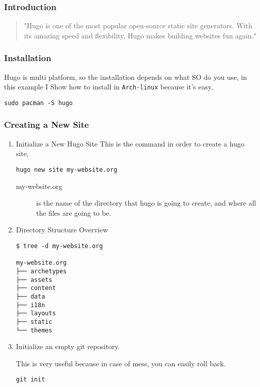 \documentclass[11pt]{article}
\begin{document}
\subsubsection{Introduction}
\label{sec:org1465eee}
\begin{quote}
"Hugo is one of the most popular open-source static site generators. With its amazing speed and flexibility, Hugo makes building websites fun again."
\end{quote}
\subsubsection{Installation}
\label{sec:org0e34b12}
Hugo is multi platform, so the installation depends on what SO do you use, in this example I Show how to install in \texttt{Arch-linux} because it's easy.

\begin{verbatim}
sudo pacman -S hugo
\end{verbatim}
\subsubsection{Creating a New Site}
\label{sec:orge7e38e4}
\begin{enumerate}
\item Initialize a New Hugo Site
\label{sec:orgfdc11a6}
This is the command in order to create a hugo site,

\begin{verbatim}
hugo new site my-website.org
\end{verbatim}

\begin{description}
\item[{my-website.org}] is the name of the directory that hugo is going to create, and where all the files are going to be.
\end{description}
\item Directory Structure Overview
\label{sec:org755fc01}
\begin{verbatim}
$ tree -d my-website.org

my-website.org
├── archetypes
├── assets
├── content
├── data
├── i18n
├── layouts
├── static
└── themes
\end{verbatim}
\item Initialize an empty git repository.
\label{sec:org6747b8f}

This is very useful because in case of mess, you can easily roll back.
\begin{verbatim}
git init
\end{verbatim}
\end{enumerate}
\end{document}
